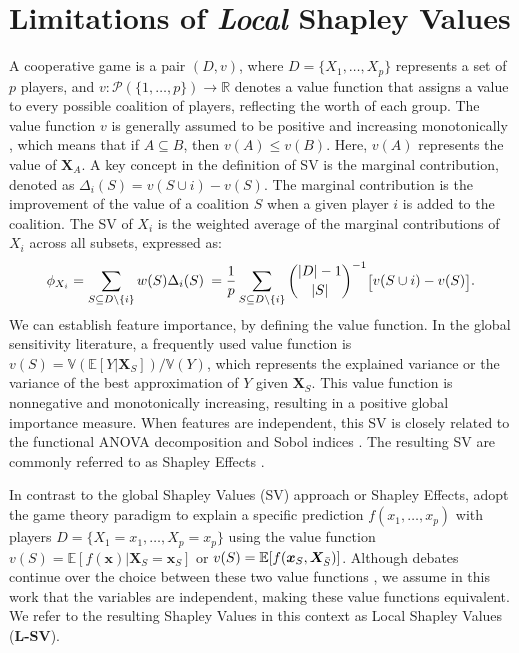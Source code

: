 \documentclass{article}
\newcommand\XS{\boldsymbol{X}_S}
\newcommand\X{\boldsymbol{X}}
\newcommand\xs{\boldsymbol{x}_S}
\newcommand\x{\boldsymbol{x}}
\theoremstyle{plain}
\theoremstyle{definition}
\theoremstyle{remark}
\newcommand{\lsv}{\textcolor{lsv}{\textbf{L-SV}}}
\begin{document}
\section{Limitations of \textit{Local} Shapley Values} \label{chap:lsv}
A cooperative game is a pair $(D, v)$, where $D=\{X_1, \dots, X_p\}$ represents a set of $p$ players, and $v: \mathcal{P}(\{1, \dots, p\}) \rightarrow \mathbb{R}$ denotes a value function that assigns a value to every possible coalition of players, reflecting the worth of each group. The value function $v$ is generally assumed to be positive and increasing monotonically \citep{dubey1977probabilistic}, which means that if $A \subseteq B$, then $v(A) \leq v(B)$. Here, $v(A)$ represents the value of $\X_A$. A key concept in the definition of SV is the marginal contribution, denoted as $\Delta_i(S)=v(S\cup i) - v(S)$. The marginal contribution is the improvement of the value of a coalition $S$ when a given player $i$ is added to the coalition. The SV of $X_i$ is the weighted average of the marginal contributions of $X_i$ across all subsets, expressed as:
\begin{align*}
\small \phi_{X_i} = \tiny \sum_{S \subseteq D\setminus\{i\}} w(S) \Delta_i(S) \ = \tiny \frac{1}{p} \sum_{S \subseteq D\setminus\{i\}} \binom{|D|-1}{|S|}^{-1} \Big[ v(S \cup i) - v(S) \Big].
\end{align*}
We can establish feature importance, by defining the value function. In the global sensitivity literature, a frequently used value function is $v(S) = \mathbb{V}(\mathbb{E}[Y \vert \XS])/\mathbb{V}(Y)$, which represents the explained variance or the variance of the best approximation of $Y$ given $\XS$. This value function is nonnegative and monotonically increasing, resulting in a positive global importance measure. When features are independent, this SV is closely related to the functional ANOVA decomposition \citep{efron1981jackknife,hoeffding1992class} and Sobol indices \citep{sobol1990sensitivity, chastaing2012generalized, Hooker2007GeneralizedFA}. The resulting SV are commonly referred to as Shapley Effects \citep{owen2014sobol, owen2017shapley}.

In contrast to the global Shapley Values (SV) approach or Shapley Effects, \cite{NIPS2017_7062, lundberg2020local} adopt the game theory paradigm to explain a specific prediction $f(x_1, \dots, x_p)$ with players $D = \{X_1 = x_1, \dots, X_p=x_p\}$ using the value function $v(S) = \mathbb{E}[f(\x) | \XS=\xs]$ or $v(S) = \mathbb{E}[f(\xs, \X_{\Bar{S}})]$. Although debates continue over the choice between these two value functions \citep{heskes2020causal, janzing2019feature, chen2020true}, we assume in this work that the variables are independent, making these value functions equivalent. We refer to the resulting Shapley Values in this context as Local Shapley Values (\lsv{}).
\end{document}
